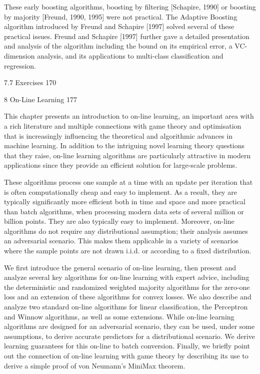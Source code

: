 These early boosting algorithms, boosting by filtering [Schapire, 1990] or boosting by majority [Freund, 1990, 1995] were not practical. The Adaptive Boosting algorithm introduced by Freund and Schapire [1997] solved several of these practical issues. Freund and Schapire [1997] further gave a detailed presentation and analysis of the algorithm including the bound on its empirical error, a VC-dimension analysis, and its applications to multi-class classification and regression.

7.7 Exercises 170



8 On-Line Learning 177

This chapter presents an introduction to on-line learning, an important area with a rich literature and multiple connections with game theory and optimisation that is increasingly influencing the theoretical and algorithmic advances in machine learning. In addition to the intriguing novel learning theory questions that they raise, on-line learning algorithms are particularly attractive in modern applications since they provide an efficient solution for large-scale problems.

These algorithms process one sample at a time with an update per iteration that is often computationally cheap and easy to implement. As a result, they are typically significantly more efficient both in time and space and more practical than batch algorithms, when processing modern data sets of several million or billion points. They are also typically easy to implement. Moreover, on-line algorithms do not require any distributional assumption; their analysis assumes an adversarial scenario. This makes them applicable in a variety of scenarios where the sample points are not drawn i.i.d. or according to a fixed distribution.

We first introduce the general scenario of on-line learning, then present and analyze several key algorithms for on-line learning with expert advice, including the deterministic and randomized weighted majority algorithms for the zero-one loss and an extension of these algorithms for convex losses. We also describe and analyze two standard on-line algorithms for linear classification, the Perceptron and Winnow algorithms, as well as some extensions. While on-line learning algorithms are designed for an adversarial scenario, they can be used, under some assumptions, to derive accurate predictors for a distributional scenario. We derive learning guarantees for this on-line to batch conversion. Finally, we briefly point out the connection of on-line learning with game theory by describing its use to derive a simple proof of von Neumann's MiniMax theorem.

